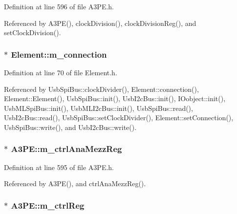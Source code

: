 Definition at line 596 of file A3PE.h.

Referenced by A3PE(), clockDivision(), clockDivisionReg(), and setClockDivision().\hypertarget{classElement_abe3de7a5dbbc9a6dd2d7e012e5fdb266}{
\subsubsection[{m\_\-connection}]{$\ast$ {\bf Element::m\_\-connection}}}
\label{classElement_abe3de7a5dbbc9a6dd2d7e012e5fdb266}


Definition at line 70 of file Element.h.

Referenced by UsbSpiBus::clockDivider(), Element::connection(), Element::Element(), UsbSpiBus::init(), UsbI2cBus::init(), IOobject::init(), UsbMLSpiBus::init(), UsbMLI2cBus::init(), UsbSpiBus::read(), UsbI2cBus::read(), UsbSpiBus::setClockDivider(), Element::setConnection(), UsbSpiBus::write(), and UsbI2cBus::write().\hypertarget{classA3PE_a126a936a5fd4fd4b83485b3637e1fa84}{
\subsubsection[{m\_\-ctrlAnaMezzReg}]{$\ast$ {\bf A3PE::m\_\-ctrlAnaMezzReg}}}
\label{classA3PE_a126a936a5fd4fd4b83485b3637e1fa84}


Definition at line 595 of file A3PE.h.

Referenced by A3PE(), and ctrlAnaMezzReg().\hypertarget{classA3PE_a264834484dd6326ebad58c2a3e1be9a6}{
\subsubsection[{m\_\-ctrlReg}]{$\ast$ {\bf A3PE::m\_\-ctrlReg}}}
\label{classA3PE_a264834484dd6326ebad58c2a3e1be9a6}


